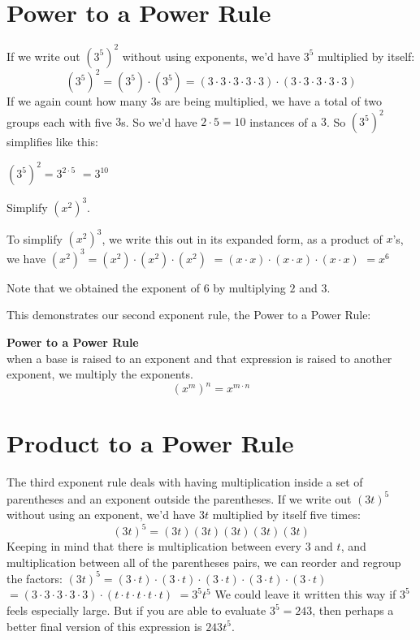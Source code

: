 \documentclass{ximera}
\begin{document}
 \section{Power to a Power Rule}

        If we write out $\left(3^5\right)^2$ without using exponents,
        we'd have $3^5$ multiplied by itself:
   \[
         \left(3^5\right)^2 = \left(3^5\right)\cdot \left(3^5\right)
         = \left(3\cdot 3\cdot 3\cdot 3 \cdot 3 \right) \cdot \left(3 \cdot 3\cdot 3\cdot 3\cdot 3\right)
      \] 
        If we again count how many $3$s are being multiplied,
        we have a total of two groups each with five $3$s.
        So we'd have $2\cdot 5=10$ instances of a $3$.
        So $\left(3^5\right)^2$ simplifies like this:
   
          $\left(3^5\right)^2 = 3^{2\cdot 5}$
          $= 3^{10}$


\begin{example}
          Simplify $\left(x^2\right)^3$.\\
\begin{explanation}
          To simplify $\left(x^2\right)^3$,
          we write this out in its expanded form,
          as a product of $x$'s, we have
            $\left(x^2\right)^3 =\left(x^2\right) \cdot \left(x^2\right)\cdot\left(x^2\right)$
            $=(x \cdot x)\cdot (x \cdot x)\cdot (x \cdot x)$
            $=x^6$
     \end{explanation}
          Note that we obtained the exponent of $6$ by multiplying $2$ and $3$.
\end{example}
      This demonstrates our second exponent rule,
      the Power to a Power Rule:
\begin{callout}
\textbf{ \Large Power to a Power Rule} \\
      when a base is raised to an exponent and that expression is raised to another exponent,
      we multiply the exponents.
   \[
      \left(x^m\right)^n = x^{m \cdot n}
   \]
\end{callout}

      \section{ Product to a Power Rule}
        The third exponent rule deals with having multiplication inside a set of parentheses and an exponent outside the parentheses.
        If we write out $\left(3t\right)^5$ without using an exponent,
        we'd have $3t$ multiplied by itself five times:
\[
      (3t)^5= (3t)(3t)(3t)(3t)(3t)
\]
        Keeping in mind that there is multiplication between every $3$ and $t$,
        and multiplication between all of the parentheses pairs,
        we can reorder and regroup the factors:
          $\left(3t\right)^5 = (3\cdot t)\cdot (3\cdot t)\cdot (3\cdot t)\cdot (3\cdot t)\cdot (3\cdot t)$
          $= \left(3\cdot 3\cdot 3\cdot 3\cdot 3 \right) \cdot \left(t \cdot t \cdot t \cdot t \cdot t\right)$
          $= 3^5 t^5$
        We could leave it written this way if $3^5$ feels especially large.
        But if you are able to evaluate $3^5=243$,
        then perhaps a better final version of this expression is $243t^5$.
 
\end{document}
